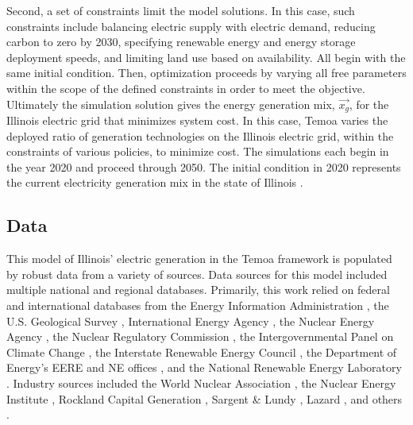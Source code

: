 Second, a set of constraints limit the model solutions. In this case, such 
constraints include balancing electric supply with electric demand, reducing 
carbon to zero by 2030, specifying renewable energy and energy
storage deployment speeds, and limiting land use based on availability.
All begin with the same initial condition. 
Then, optimization 
proceeds by varying all free parameters within the scope of the defined 
constraints in order to meet the objective. Ultimately the simulation solution 
gives the energy generation mix, $\vec{x_g}$, for the Illinois electric grid that minimizes system cost. 
In this case, Temoa varies the 
deployed ratio of generation technologies on the Illinois electric grid, within 
the constraints of various policies, to minimize cost. The simulations each 
begin in the year 2020 and proceed through 2050. The initial condition in 2020 
represents the current electricity generation mix in the state of Illinois 
.

\FloatBarrier
\subsection{Data}

This model of Illinois' electric generation in the 
Temoa framework
is populated by robust data from a variety of sources.
Data sources for this model included multiple national and regional 
databases. Primarily, this work relied on federal and international databases from the 
Energy Information Administration 
\cite{us_energy_information_administration_eia_preliminary_2021,energy_information_administration_state_2020,us_energy_information_administration_eia_electric_2021,us_energy_information_administration_eia_illinois_2020}, 
the U.S. Geological Survey \cite{hoen_united_2018}, 
International Energy Agency \cite{lorenczik_projected_2020}, 
the Nuclear Energy Agency \cite{crozat_full_2018}, 
the Nuclear Regulatory Commission 
\cite{united_states_nuclear_regulatory_commission_illinois_2020}, 
the Intergovernmental Panel on Climate Change 
\cite{intergovernmental_panel_on_climate_change_annex_2014,intergovernmental_panel_on_climate_change_climate_2014,intergovernmental_panel_on_climate_change_climate_2014-1,intergovernmental_panel_on_climate_change_climate_2014-2},
the Interstate Renewable Energy Council 
\cite{sherwood_us_2009,sherwood_us_2010,sherwood_us_2011,brown_solid_1996,sherwood_us_2012,sherwood_us_2013,sherwood_us_2014}, 
the Department of Energy's EERE and NE offices 
\cite{us_department_of_energy_capital_2016}, and the National Renewable Energy 
Laboratory 
\cite{nrel_national_renewable_energy_laboratory_2020_2020,sengupta_national_2018}.
Industry sources included the World Nuclear Association
\cite{world_nuclear_association_nuclear_2017}
, 
the Nuclear Energy Institute 
\cite{desai_nuclear_2018,desai_nuclear_2020,murphy_impacts_2019,tessum_air_2019},
Rockland Capital Generation \cite{rockland_capital_natural_2021},
Sargent \& Lundy \cite{sargent__lundy_capital_2020}, 
Lazard \cite{ray_lazards_2020},
and others 
\cite{the_solar_foundation_national_2020,solar_energy_industries_association_illinois_2020,rutovitz_calculating_2015}.


